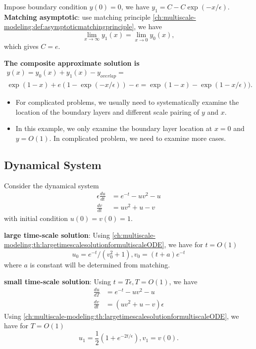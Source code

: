 \begin{refsection}
\begin{example}
Impose boundary condition $y(0) = 0$, we have $y_1 =C - C\exp(-x/\epsilon)$.\\

\textbf{Matching asymptotic}: use matching principle \autoref{ch:multiscale-modeling:def:asymptoticmatchingprinciple}, we have
$$\lim_{x\to \infty} y_1(x) = \lim_{x\to 0} y_0(x),$$
which gives $C = e$. 

\textbf{The composite approximate solution is}
\begin{align*}
y(x) = y_0(x) + y_1(x) - y_{overlap}=\\
 \exp(1-x) + e(1 - \exp(-x/\epsilon)) - e =  \exp(1-x)  - \exp(1 -x/\epsilon)).
\end{align*}
\end{example}

\begin{remark}\hfill
	\begin{itemize}
		\item For complicated problems, we usually need to systematically examine the location of the boundary layers and different scale pairing of $y$ and $x$. 
		\item In this example, we only examine the boundary layer location at $x = 0$ and $y = O(1)$. In complicated problem, we need to examine more cases. 
	\end{itemize}
\end{remark}

\subsection{Dynamical System}

\begin{example}\cite[79]{verhulst2005methods}
Consider the dynamical system	
\begin{align*}
\epsilon \frac{du}{dt} &= e^{-t} - uv^2 - u\\
\frac{dv}{dt} &= uv^2 + u -v
\end{align*}
with initial condition $u(0) = v(0) =1$. 

\textbf{large time-scale solution}: Using \autoref{ch:multiscale-modeling:th:largetimescalesolutionformultiscaleODE}, we have for $t = O(1)$
$$u_0 = e^{-t}/(v_0^2 + 1), v_0 = (t + a)e^{-t}$$
where $a$ is constant will be determined from matching.

\textbf{small time-scale solution}: Using $t = T\epsilon, T=O(1)$, we have
\begin{align*}
 \frac{du}{dT} &= e^{-t} - uv^2 - u\\
\frac{dv}{dt} &= (uv^2 + u -v)\epsilon 
\end{align*}
Using \autoref{ch:multiscale-modeling:th:largetimescalesolutionformultiscaleODE}, we have for $T = O(1)$
$$u_1 = \frac{1}{2}(1 + e^{-2t/\epsilon}), v_1 = v(0).$$


\end{example}
\end{refsection}

